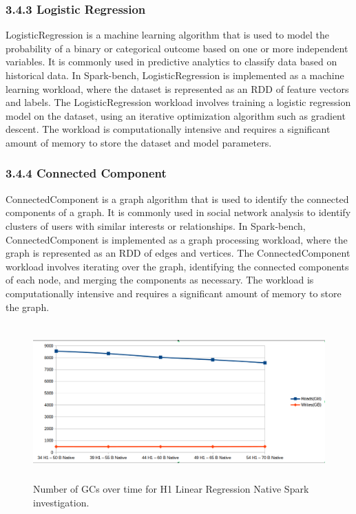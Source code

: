 \documentclass[twocolumn,10pt]{asme2e}
\begin{document}
\subsubsection*{3.4.3 Logistic Regression}
LogisticRegression is a machine learning algorithm that is used to model the probability of a binary or categorical outcome based on one or more independent variables. It is commonly used in predictive analytics to classify data based on historical data. In Spark-bench, LogisticRegression is implemented as a machine learning workload, where the dataset is represented as an RDD of feature vectors and labels.
The LogisticRegression workload involves training a logistic regression model on the dataset, using an iterative optimization algorithm such as gradient descent. The workload is computationally intensive and requires a significant amount of memory to store the dataset and model parameters.

\subsubsection*{3.4.4 Connected Component}
ConnectedComponent is a graph algorithm that is used to identify the connected components of a graph. It is commonly used in social network analysis to identify clusters of users with similar interests or relationships. In Spark-bench, ConnectedComponent is implemented as a graph processing workload, where the graph is represented as an RDD of edges and vertices.
The ConnectedComponent workload involves iterating over the graph, identifying the connected components of each node, and merging the components as necessary. The workload is computationally intensive and requires a significant amount of memory to store the graph.


\begin{figure}[ht]
        \includegraphics[width=12cm,height=6cm]{gcs_linr_h1_native.png}
	\caption{Number of GCs over time for H1 Linear Regression Native Spark investigation.}
	\label{fig:gcs_linr_h1_native}
\end{figure}
\end{document}
